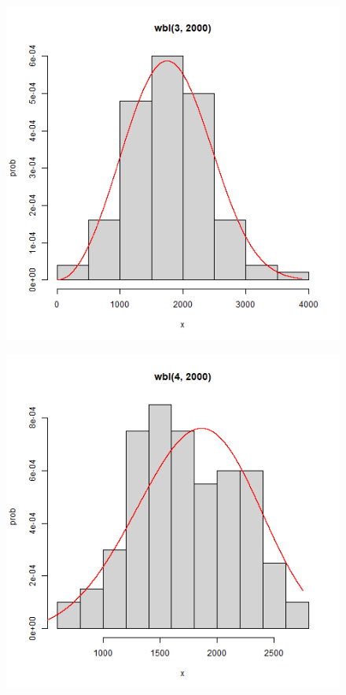 \documentclass{article}
\begin{document}
\begin{figure}[h!] \begin{center}
\includegraphics[height=0.4\textheight, angle=0]{"kolos2_2.png"}
\end{center} \end{figure}

\newpage
\begin{figure}[h!] \begin{center}
\includegraphics[height=0.4\textheight, angle=0]{"kolos2_3.png"}
\end{center} \end{figure}
\end{document}
